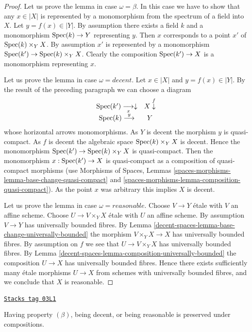 \begin{proof}
Let us prove the lemma in case $\omega = \beta$. In this case we have to show
that any $x \in |X|$ is represented by a monomorphism from the spectrum
of a field into $X$. Let $y = f(x) \in |Y|$. By assumption there exists
a field $k$ and a monomorphism $\operatorname{Spec}(k) \to Y$ representing $y$.
Then $x$ corresponds to a point $x'$ of $\operatorname{Spec}(k) \times_Y X$.
By assumption $x'$ is represented by a monomorphism
$\operatorname{Spec}(k') \to \operatorname{Spec}(k) \times_Y X$. Clearly the composition
$\operatorname{Spec}(k') \to X$ is a monomorphism representing $x$.

\medskip\noindent
Let us prove the lemma in case $\omega = decent$.
Let $x \in |X|$ and $y = f(x) \in |Y|$. By the result of the preceding
paragraph we can choose a diagram
$$
\begin{array}{cc}\operatorname{Spec}(k') \underset{x}{\longrightarrow}\downarrow & X \overset{f}{\downarrow} \\ \operatorname{Spec}(k) \overset{y}{\longrightarrow} & Y\end{array}
$$
whose horizontal arrows monomorphisms. As $Y$ is decent the morphism
$y$ is quasi-compact. As $f$ is decent the algebraic space
$\operatorname{Spec}(k) \times_Y X$ is decent. Hence the monomorphism
$\operatorname{Spec}(k') \to \operatorname{Spec}(k) \times_Y X$ is quasi-compact.
Then the monomorphism $x : \operatorname{Spec}(k') \to X$ is quasi-compact
as a composition of quasi-compact morphisms (use
Morphisms of Spaces, Lemmas
\ref{spaces-morphisms-lemma-base-change-quasi-compact} and
\ref{spaces-morphisms-lemma-composition-quasi-compact}).
As the point $x$ was arbitrary this implies $X$ is decent.

\medskip\noindent
Let us prove the lemma in case $\omega = reasonable$.
Choose $V \to Y$ \'etale with $V$ an affine scheme.
Choose $U \to V \times_Y X$ \'etale with $U$ an affine scheme.
By assumption $V \to Y$ has universally bounded fibres. By
Lemma \ref{decent-spaces-lemma-base-change-universally-bounded}
the morphism $V \times_Y X \to X$ has universally bounded fibres.
By assumption on $f$ we see that $U \to V \times_Y X$ has
universally bounded fibres. By
Lemma \ref{decent-spaces-lemma-composition-universally-bounded}
the composition $U \to X$ has universally bounded fibres.
Hence there exists sufficiently many \'etale morphisms $U \to X$
from schemes with universally bounded fibres, and we conclude
that $X$ is reasonable.
\end{proof}

\begin{lemma}
\label{decent-spaces-lemma-composition-relative-conditions}
\href{https://stacks.math.columbia.edu/tag/03L1}{\texttt{Stacks tag 03L1}}

Having property $(\beta)$, being decent, or being reasonable
is preserved under compositions.
\end{lemma}

